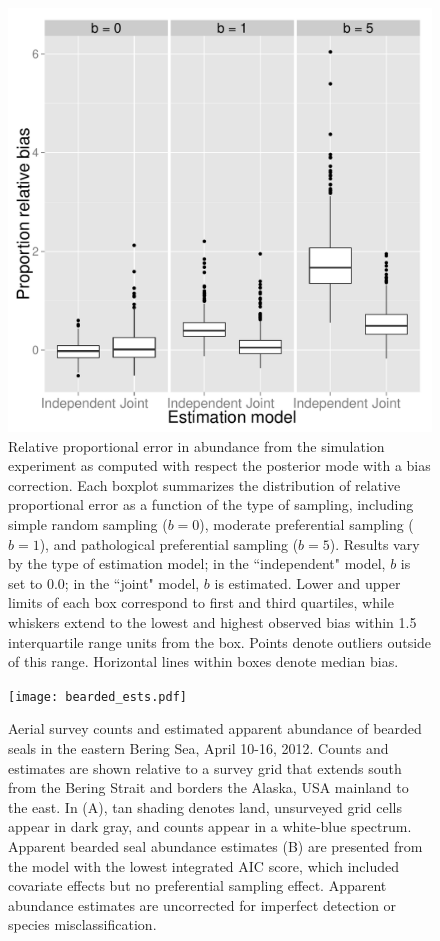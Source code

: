 \documentclass[times,mee,doublespace,]{besauth2}
\begin{document}
\begin{figure} %
\begin{center}
\includegraphics[width=170mm]{bias.pdf}
\caption{Relative proportional error in abundance from the simulation experiment as computed with respect the posterior mode with a bias correction. Each boxplot summarizes the distribution of relative proportional error as a function of the type of sampling, including simple random sampling ($b=0$), moderate preferential sampling ($b=1$), and pathological preferential sampling ($b=5$). Results vary by the type of estimation model; in the ``independent" model, $b$ is set to 0.0; in the ``joint" model, $b$ is estimated.  Lower and upper limits of each box correspond to first and third quartiles, while whiskers extend to the lowest and highest observed bias within 1.5 interquartile range units from the box.  Points denote outliers outside of this range.  Horizontal lines within boxes denote median bias.  }
\label{fig:sim_bias}
\end{center}
\end{figure}

\begin{figure} %
\begin{center}
\texttt{[image: bearded\_ests.pdf]}
\caption{Aerial survey counts and estimated apparent abundance of bearded seals in the eastern Bering Sea, April 10-16, 2012. Counts and estimates are shown relative to a survey grid that extends south from the Bering Strait and borders the Alaska, USA mainland to the east. In (A), tan shading denotes land, unsurveyed grid cells appear in dark gray, and counts appear in a white-blue spectrum.  Apparent bearded seal abundance estimates (B) are presented from the model with the lowest integrated AIC score, which included covariate effects but no preferential sampling effect.  Apparent abundance estimates are uncorrected for imperfect detection or species misclassification.}
\label{fig:bearded_ests}
\end{center}
\end{figure}
\end{document}
